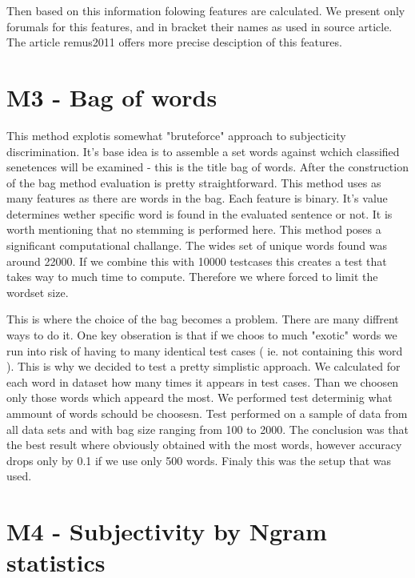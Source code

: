 Then based on this information folowing features are calculated. We present only forumals for this features, and in bracket their names as used in source article. The article  \cite{ subsection 2.1 }{remus2011} offers more precise desciption of this features.


\section{M3 - Bag of words}

This method explotis somewhat "bruteforce" approach to subjecticity discrimination. It's base idea is to assemble a set words against wchich classified senetences will be examined
- this is the title bag of words. After the construction of the bag method evaluation is pretty straightforward. This method uses as many features as there are words in the bag. Each
feature is binary. It's value determines wether specific word is found in the evaluated sentence or not. It is worth mentioning that no stemming is performed here. This method poses a significant computational challange. The wides set of unique
words found was around 22000. If we combine this with 10000 testcases this creates a test that takes way to much time to compute. Therefore we where forced to limit the wordset size. 

This is where the choice of the bag becomes a problem.  There are many diffrent ways to do it. One key obseration is that if we choos to much "exotic" words we run into risk of having to 
many identical test cases ( ie. not containing this word ). This is why we decided to test a pretty simplistic approach. We calculated for each word in dataset how many times it appears in
test cases. Than we choosen  only those words which appeard the most. We performed test determinig what ammount of words schould be choosesn. Test performed on a sample of data from all data
sets and with bag size ranging from 100 to 2000.  The conclusion was that the best result where obviously obtained  with the most words, however accuracy drops only by 0.1 if we use only 500 
words. Finaly this was the setup that was used. 

\section{M4 - Subjectivity by Ngram statistics}

